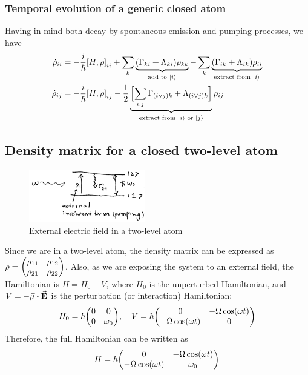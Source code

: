 \subsubsection*{Temporal evolution of a generic closed atom}
Having in mind both decay by spontaneous emission and pumping processes, we have
\begin{subequations}
\begin{align}
	\dot{\rho}_{ii} &= - \frac{i}{\hbar} \comm{H}{\rho}_{ii} + \sum_{k} \underbrace{(\Gamma_{ki} + \Lambda_{ki} ) \rho_{kk}}_{\text{add to } \ket{i}} - \sum_{k} \underbrace{(\Gamma_{ik} + \Lambda_{ik} ) \rho_{ii}}_{\text{extract from } \ket{i}} \\
	\dot{\rho}_{ij} &= - \frac{i}{\hbar} \comm{H}{\rho}_{ij} - \frac{1}{2} \underbrace{\qty\Big[\sum_{i,j} \Gamma_{(i \vee j) k} + \Lambda_{(i \vee j) k} ]}_{\text{extract from } \ket{i} \text{ or } \ket{j}} \rho_{ij}
\end{align}
\end{subequations}

\subsection{Density matrix for a closed two-level atom}
\begin{figure}[H]
	\centering
	\includegraphics[width=0.45\textwidth]{./images/3-two-level-external}
	\caption{External electric field in a two-level atom}
	\label{fig:two-level-external}
\end{figure}
Since we are in a two-level atom, the density matrix can be expressed as $\rho = \mqty( \rho_{11} & \rho_{12} \\ \rho_{21} & \rho_{22} )$. Also, as we are exposing the system to an external field, the Hamiltonian is $H = H_{0} + V$, where $H_{0}$ is the unperturbed Hamiltonian, and $V = - \va{\mu} \vdot \va{E}$ is the perturbation (or interaction) Hamiltonian:
\begin{align*}
	H_{0} = \hbar \mqty(0 & 0 \\ 0 & \omega_{0}) \qc V = \hbar \mqty( 0 & -\Omega \cos(\omega t) \\ -\Omega \cos(\omega t) & 0 )
\end{align*}
Therefore, the full Hamiltonian can be written as
\begin{align}
	H = \hbar \mqty( 0 & -\Omega \cos(\omega t) \\ -\Omega \cos(\omega t) & \omega_{0} )
\end{align}

